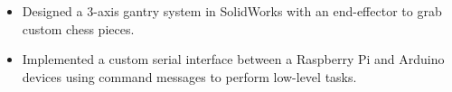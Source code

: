 \documentclass[10pt,a4paper,ragged2e,withhyper]{altacv}
\begin{document}
    \begin{itemize}
        \item Designed a 3-axis gantry system in SolidWorks with an end-effector to grab custom chess pieces.
        \item Implemented a custom serial interface between a Raspberry Pi and Arduino devices using command messages to perform low-level tasks.
    \end{itemize}
    \vspace{-1.55em}
\end{document}
